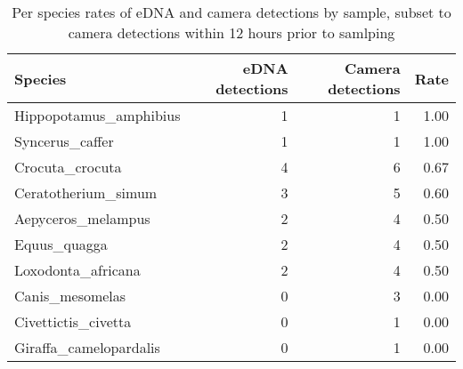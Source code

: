 \begin{table}[ht]
\centering
\begin{tabular}{lrrr}
  \hline
Species & eDNA detections & Camera detections & Rate \\ 
  \hline
Hippopotamus\_amphibius & 1 & 1 & 1.00 \\ 
  Syncerus\_caffer & 1 & 1 & 1.00 \\ 
  Crocuta\_crocuta & 4 & 6 & 0.67 \\ 
  Ceratotherium\_simum & 3 & 5 & 0.60 \\ 
  Aepyceros\_melampus & 2 & 4 & 0.50 \\ 
  Equus\_quagga & 2 & 4 & 0.50 \\ 
  Loxodonta\_africana & 2 & 4 & 0.50 \\ 
  Canis\_mesomelas & 0 & 3 & 0.00 \\ 
  Civettictis\_civetta & 0 & 1 & 0.00 \\ 
  Giraffa\_camelopardalis & 0 & 1 & 0.00 \\ 
   \hline
\end{tabular}
\caption{Per species rates of eDNA and camera detections by sample, subset to camera detections within 12 hours prior to samlping} 
\end{table}
